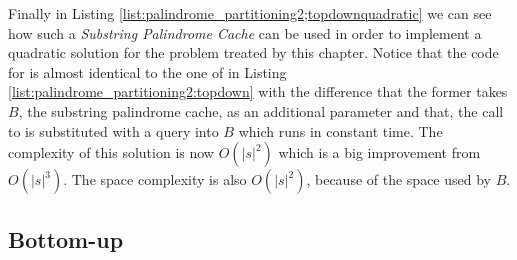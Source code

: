 Finally in Listing \ref{list:palindrome_partitioning2;topdownquadratic} we can see how such a \textit{Substring Palindrome Cache} can be used in order to implement a quadratic solution for the problem treated by this chapter.
Notice that the code for  is almost identical to the one of 
in Listing \ref{list:palindrome_partitioning2:topdown} with the
difference that the former takes $B$, the substring palindrome cache, as an additional parameter and that, the call to
 is substituted with a query into $B$ which runs in constant time. The
complexity of this solution is now $O(|s|^2)$ which is a big improvement from $O(|s|^3)$. 
The space complexity is also $O(|s|^2)$, because of the space used by $B$.





\subsection{Bottom-up}


